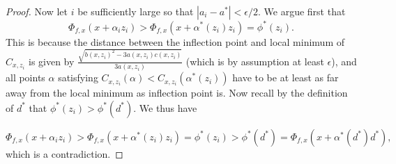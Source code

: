\documentclass[10pt,a4paper]{amsart}
\begin{document}
\begin{proof}
Now let $i$ be sufficiently large so that $|a_i - a^*| < \epsilon/2$. We argue first that 
$$\Phi_{f,x}(x + \alpha_iz_i) > \Phi_{f,x}(x+\alpha^*(z_i)z_i) = \phi^*(z_i).$$
This is because the distance between the inflection point and local minimum of $C_{x,z_i}$ is given by $\frac{\sqrt{b(x,z_i)^2 - 3a(x,z_i)c(x,z_i)}}{3a(x,z_i)}$ (which is by assumption at least $\epsilon$), and all points $\alpha$ satisfying $C_{x,z_i}(\alpha) < C_{x,z_i}(\alpha^*(z_i))$ have to be at least as far away from the local minimum as inflection point is. Now recall by the definition of $d^*$ that $\phi^*(z_i) > \phi^*(d^*)$. We thus have

$$\Phi_{f,x}(x + \alpha_iz_i) > \Phi_{f,x}(x+\alpha^*(z_i)z_i) = \phi^*(z_i) > \phi^*(d^*) = \Phi_{f,x}(x + \alpha^*(d^*)d^*),$$
which is a contradiction.
\end{proof}
\end{document}
